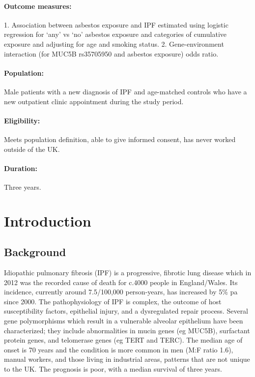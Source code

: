 \documentclass[a4paper,10pt]{article}
\begin{document}
\paragraph{Outcome measures:} 1. Association between asbestos exposure and IPF estimated using logistic regression for ‘any’ vs ‘no’ asbestos exposure and categories of cumulative exposure and adjusting for age and smoking status. 2. Gene-environment interaction (for MUC5B rs35705950 and asbestos exposure) odds ratio.
\paragraph{Population:} Male patients with a new diagnosis of IPF and age-matched controls who have a new outpatient clinic appointment during the study period.
\paragraph{Eligibility:} Meets population definition, able to give informed consent, has never worked outside of the UK.
\paragraph{Duration:} Three years.


\newpage


\section{Introduction}
\subsection{Background}

Idiopathic pulmonary fibrosis (IPF) is a progressive, fibrotic lung disease which in 2012 was the recorded cause of death for c.4000 people in England/Wales. Its incidence, currently around 7.5/100,000 person-years, has increased by 5\% pa since 2000.\cite{Navaratnam2011} The pathophysiology of IPF is complex, the outcome of host susceptibility factors, epithelial injury, and a dysregulated repair process. Several gene polymorphisms which result in a vulnerable alveolar epithelium have been characterized; they include abnormalities in mucin genes (eg MUC5B), surfactant protein genes, and telomerase genes (eg TERT and TERC).\cite{Maher2012}\cite{Ley2013}\cite{Spagnolo20.5} The median age of onset is 70 years and the condition is more common in men (M:F ratio 1.6), manual workers, and those living in industrial areas\cite{Navaratnam2011}, patterns that are not unique to the UK.\cite{Ley2013} The prognosis is poor, with a median survival of three years.\cite{Hubbard1998}\cite{Vancheri2010} 
\end{document}
